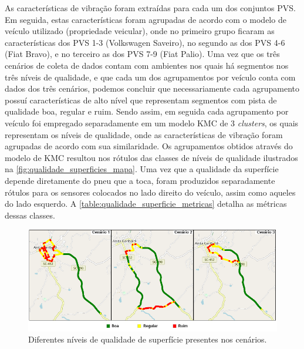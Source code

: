 As características de vibração foram extraídas para cada um dos conjuntos PVS. Em seguida, estas características foram agrupadas de acordo com o modelo de veículo utilizado (propriedade veicular), onde no primeiro grupo ficaram as características dos PVS 1-3 (Volkswagen Saveiro), no segundo as dos PVS 4-6 (Fiat Bravo), e no terceiro as dos PVS 7-9 (Fiat Palio). Uma vez que os três cenários de coleta de dados contam com ambientes nos quais há segmentos nos três níveis de qualidade, e que cada um dos agrupamentos por veículo conta com dados dos três cenários, podemos concluir que necessariamente cada agrupamento possuí características de alto nível que representam segmentos com pista de qualidade boa, regular e ruim. Sendo assim, em seguida cada agrupamento por veículo foi empregado separadamente em um modelo KMC de 3 \textit{clusters}, os quais representam os níveis de qualidade, onde as características de vibração foram agrupadas de acordo com sua similaridade. Os agrupamentos obtidos através do modelo de KMC resultou nos rótulos das classes de níveis de qualidade ilustrados na \autoref{fig:qualidade_superficies_mapa}. Uma vez que a qualidade da superfície depende diretamente do pneu que a toca, foram produzidos separadamente rótulos para os sensores colocados no lado direito do veículo, assim como aqueles do lado esquerdo. A \autoref{table:qualidade_superficie_metricas} detalha as métricas dessas classes.  
 
\begin{figure}[h!]
  \centering
  \caption{Diferentes níveis de qualidade de superfície presentes nos cenários.}
   \label{fig:qualidade_superficies_mapa}
   \includegraphics[width=1\textwidth]{figuras/fig_27.png}
\end{figure}

